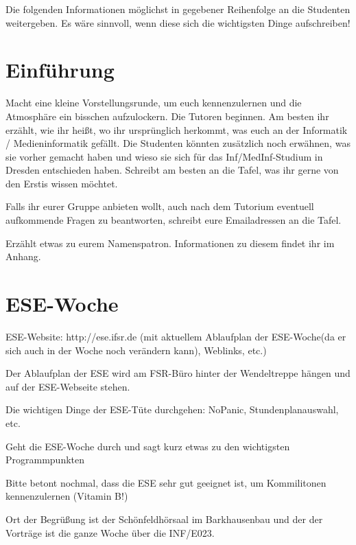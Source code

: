 \documentclass[a4paper,12pt]{report}
\begin{document}
Die folgenden Informationen möglichst in gegebener Reihenfolge an die Studenten weitergeben. Es wäre sinnvoll, wenn diese sich die wichtigsten Dinge aufschreiben!

\section{Einführung}
\begin{itemize*}
\item Macht eine kleine Vorstellungsrunde, um euch kennenzulernen und die Atmosphäre ein bisschen aufzulockern. Die Tutoren beginnen. Am besten ihr erzählt, wie ihr heißt, wo ihr ursprünglich herkommt, was euch an der Informatik / Medieninformatik gefällt. Die Studenten könnten zusätzlich noch erwähnen, was sie vorher gemacht haben und wieso sie sich für das Inf/MedInf-Studium in Dresden entschieden haben. Schreibt am besten an die Tafel, was ihr gerne von den Erstis wissen möchtet.
\item Falls ihr eurer Gruppe anbieten wollt, auch nach dem Tutorium eventuell aufkommende Fragen zu beantworten, schreibt eure Emailadressen an die Tafel.
\item Erzählt etwas zu eurem Namenspatron. Informationen zu diesem findet ihr im Anhang.
\end{itemize*}

\section{ESE-Woche}
\begin{itemize*}
\item ESE-Website: http://ese.ifsr.de (mit aktuellem Ablaufplan der ESE-Woche(da er sich auch in der Woche noch verändern kann), Weblinks, etc.)
\item Der Ablaufplan der ESE wird am FSR-Büro hinter der Wendeltreppe hängen und auf der ESE-Webseite stehen.
\item Die wichtigen Dinge der ESE-Tüte durchgehen: NoPanic, Stundenplanauswahl, etc.
\item Geht die ESE-Woche durch und sagt kurz etwas zu den wichtigsten Programmpunkten
\item Bitte betont nochmal, dass die ESE sehr gut geeignet ist, um Kommilitonen kennenzulernen (Vitamin B!)
\end{itemize*}
\vspace{0.5cm}
Ort der Begrüßung ist der Schönfeldhörsaal im Barkhausenbau und der der Vorträge ist die ganze Woche über die INF/E023.
\end{document}
